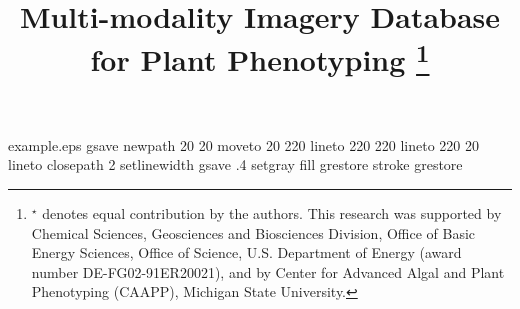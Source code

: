 %
%
%
%
%
\begin{filecontents*}{example.eps}
gsave
newpath
  20 20 moveto
  20 220 lineto
  220 220 lineto
  220 20 lineto
closepath
2 setlinewidth
gsave
  .4 setgray fill
grestore
stroke
grestore
\end{filecontents*}
%
\RequirePackage{fix-cm}
%
\documentclass[twocolumn]{svjour3}          %
%
\smartqed  %
%
\usepackage{bm}
\usepackage{graphicx}
\usepackage{epstopdf}
\usepackage{color}
\usepackage{multirow}
\usepackage{tabularx}
\usepackage[misc,geometry]{ifsym}
\usepackage{threeparttable}


\newcommand\todo[1]{\textcolor{red}{#1}}

%
%
%
%
%
\sloppy


\title{Multi-modality Imagery Database for Plant Phenotyping \thanks{$^\star$ denotes equal contribution by the authors. This research was supported by Chemical Sciences, Geosciences and Biosciences Division, Office of Basic Energy Sciences, Office of Science, U.S. Department of Energy (award number DE-FG02-91ER20021), and by Center for Advanced Algal and Plant Phenotyping (CAAPP), Michigan State University.
}
}

